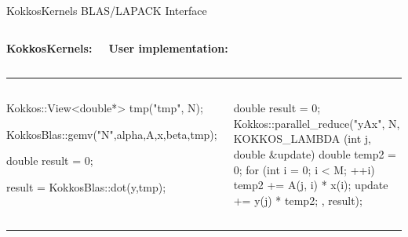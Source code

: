 \begin{frame}[fragile]{KokkosKernels BLAS/LAPACK Interface}

\vspace{-1em}

  \begin{columns}[t,onlytextwidth]
      \begin{center}
        \textbf{KokkosKernels:}
      \end{center}
      \begin{center}
        \textbf{User implementation:}
      \end{center}
  \end{columns}

\noindent\rule{4in}{0.4pt}

  \begin{columns}[t,onlytextwidth]
      \begin{flushleft}
      \vspace{-2em}
  \begin{code}[keywords={View,double,gemv,dot}, basicstyle=\tiny, breaklines=true]
Kokkos::View<double*> tmp("tmp", N);

KokkosBlas::gemv("N",alpha,A,x,beta,tmp);


double result = 0;

result = KokkosBlas::dot(y,tmp);
  \end{code}
      \end{flushleft}
      \begin{flushright}
      \vspace{-2em}
  \begin{code}[keywords={parallel_reduce,for,int,double}, basicstyle=\tiny, breaklines=true]
double result = 0;
Kokkos::parallel_reduce("yAx", N, 
 KOKKOS_LAMBDA (int j, double &update) { 
  double temp2 = 0;
   for (int i = 0; i < M; ++i) { 
     temp2 += A(j, i) * x(i);
   }
   update += y(j) * temp2;
 }, result);
  \end{code}
      \end{flushright}
  \end{columns}

\noindent\rule{4in}{0.4pt}


\end{frame}
